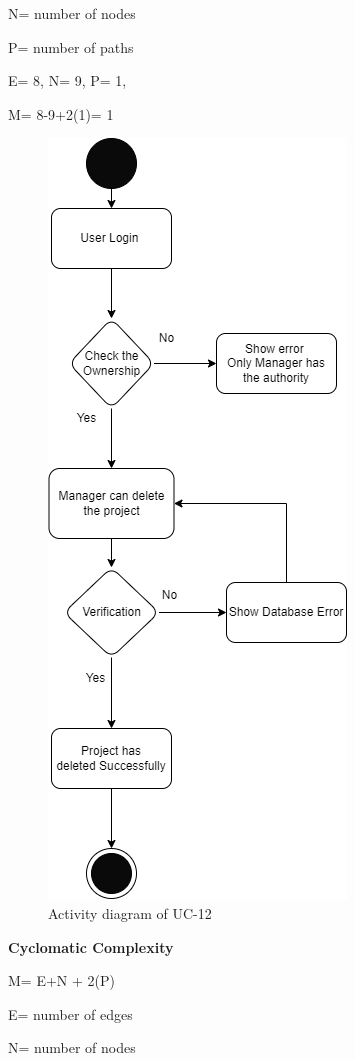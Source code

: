 N= number of nodes

P= number of paths

E= 8,
N= 9,
P= 1,

M= 8-9+2(1)= 1

\begin{figure}[H]
    \centering
    \includegraphics[scale=0.7]{./diagrams/Activity Diagram/ad-12.png}
    \caption{Activity diagram of UC-12}
    \label{fig:act-12}

\end{figure}


\textbf{Cyclomatic Complexity}

M= E+N + 2(P)

E= number of edges

N= number of nodes

